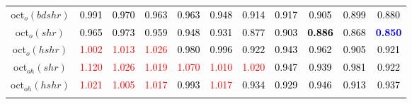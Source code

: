 \begin{tabular}[t]{c|>{}cccc>{}c|ccccc}
oct$_o(bdshr)$ & \textcolor{black}{0.991} & \textcolor{black}{0.970} & \textcolor{black}{0.963} & \textcolor{black}{0.963} & \textcolor{black}{0.948} & \textcolor{black}{0.914} & \textcolor{black}{0.917} & \textcolor{black}{0.905} & \textcolor{black}{0.899} & \textcolor{black}{0.880}\\
oct$_o(shr)$ & \textcolor{black}{0.965} & \textcolor{black}{0.973} & \textcolor{black}{0.959} & \textcolor{black}{0.948} & \textcolor{black}{0.931} & \textcolor{black}{0.877} & \textcolor{black}{0.903} & \textcolor{black}{\textbf{0.886}} & \textcolor{black}{0.868} & \textcolor{blue}{\textbf{0.850}}\\
oct$_o(hshr)$ & \textcolor{red}{1.002} & \textcolor{red}{1.013} & \textcolor{red}{1.026} & \textcolor{black}{0.980} & \textcolor{black}{0.996} & \textcolor{black}{0.922} & \textcolor{black}{0.943} & \textcolor{black}{0.962} & \textcolor{black}{0.905} & \textcolor{black}{0.921}\\
oct$_{oh}(shr)$ & \textcolor{red}{1.120} & \textcolor{red}{1.026} & \textcolor{red}{1.019} & \textcolor{red}{1.070} & \textcolor{red}{1.010} & \textcolor{red}{1.020} & \textcolor{black}{0.947} & \textcolor{black}{0.939} & \textcolor{black}{0.981} & \textcolor{black}{0.922}\\
oct$_{oh}(hshr)$ & \textcolor{red}{1.021} & \textcolor{red}{1.005} & \textcolor{red}{1.017} & \textcolor{black}{0.993} & \textcolor{red}{1.017} & \textcolor{black}{0.934} & \textcolor{black}{0.929} & \textcolor{black}{0.946} & \textcolor{black}{0.913} & \textcolor{black}{0.937}\\
\bottomrule
{}\\
\end{tabular}
